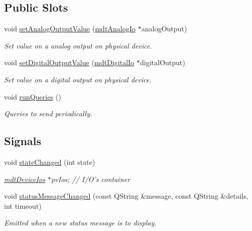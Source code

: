 \subsection*{Public Slots}
\begin{DoxyCompactItemize}
\item 
void \hyperlink{classmdt_device_a83cdf442f4cec7261742ca5939e390a1}{set\-Analog\-Output\-Value} (\hyperlink{classmdt_analog_io}{mdt\-Analog\-Io} $\ast$analog\-Output)
\begin{DoxyCompactList}\small\item\em Set value on a analog output on physical device. \end{DoxyCompactList}\item 
void \hyperlink{classmdt_device_a93abbc706a1e6601ce947eee5e50fba6}{set\-Digital\-Output\-Value} (\hyperlink{classmdt_digital_io}{mdt\-Digital\-Io} $\ast$digital\-Output)
\begin{DoxyCompactList}\small\item\em Set value on a digital output on physical device. \end{DoxyCompactList}\item 
void \hyperlink{classmdt_device_a14634fec6cd6bae810562b3bd88a5c05}{run\-Queries} ()
\begin{DoxyCompactList}\small\item\em Queries to send periodically. \end{DoxyCompactList}\end{DoxyCompactItemize}
\subsection*{Signals}
\begin{DoxyCompactItemize}
\item 
void \hyperlink{classmdt_device_aecd2d9d2cc3665f2084d0fd20eb3db2d}{state\-Changed} (int state)
\begin{DoxyCompactList}\small\item\em \hyperlink{classmdt_device_ios}{mdt\-Device\-Ios} $\ast$pv\-Ios; // I/\-O's container \end{DoxyCompactList}\item 
void \hyperlink{classmdt_device_a3fbc6e71241e2e9daa2d8557f870c03c}{status\-Message\-Changed} (const Q\-String \&message, const Q\-String \&details, int timeout)
\begin{DoxyCompactList}\small\item\em Emitted when a new status message is to display. \end{DoxyCompactList}\end{DoxyCompactItemize}
